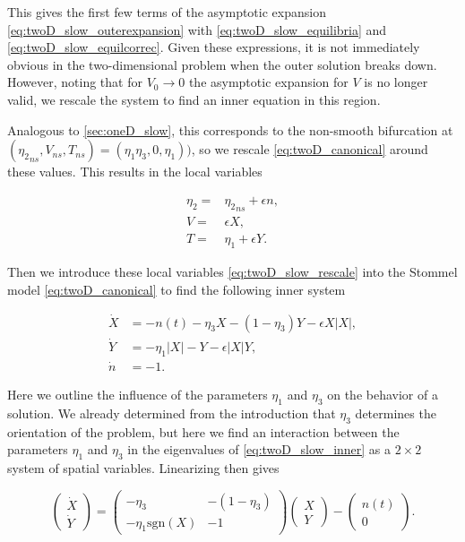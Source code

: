 This gives the first few terms of the asymptotic expansion \eqref{eq:twoD_slow_outerexpansion} with \eqref{eq:twoD_slow_equilibria} and \eqref{eq:twoD_slow_equilcorrec}. Given these expressions, it is not immediately obvious in the two-dimensional problem when the outer solution breaks down. However, noting that for $V_0\to 0$ the asymptotic expansion for $V$ is no longer valid, we rescale the system to find an inner equation in this region. 

Analogous to \autoref{sec:oneD_slow}, this corresponds to the non-smooth bifurcation at $({\eta_2}_{ns},V_{ns},T_{ns})=(\eta_1\eta_3,0,\eta_1))$, so we rescale \eqref{eq:twoD_canonical} around these values. This results in the local variables

\begin{equation}\label{eq:twoD_slow_rescale}
\begin{aligned}
\eta_2=&{\eta_2}_{ns}+\epsilon n,\\
V=&\epsilon X,\\
T=&\eta_1+\epsilon Y.
\end{aligned}
\end{equation}

Then we introduce these local variables \eqref{eq:twoD_slow_rescale} into the Stommel model \eqref{eq:twoD_canonical} to find the following inner system

\begin{equation}\label{eq:twoD_slow_inner}
\begin{aligned}
  \dot{X} & = -n(t)-\eta_3 X-(1-\eta_3)Y-\epsilon X|X|, \\
  \dot{Y} & = -\eta_1 |X|-Y-\epsilon |X|Y, \\
 \dot{n} & = -1.
 \end{aligned}
\end{equation}

Here we outline the influence of the parameters $\eta_1$ and $\eta_3$ on the behavior of a solution. We already determined from the introduction that $\eta_3$ determines the orientation of the problem, but here we find an interaction between the parameters $\eta_1$ and $\eta_3$ in the eigenvalues of \eqref{eq:twoD_slow_inner} as a $2\times 2$ system of spatial variables. Linearizing then gives

\begin{equation}\label{eq:twoD_slow_innermatrix}
\begin{pmatrix}
\dot{X}\\
\dot{Y}
\end{pmatrix}=
\begin{pmatrix}
-\eta_3 & -(1-\eta_3) \\ 
-\eta_1\text{sgn}(X) & -1
\end{pmatrix}
\begin{pmatrix}
X\\
Y
\end{pmatrix}-
\begin{pmatrix}
n(t)\\
0
\end{pmatrix}.
\end{equation}

